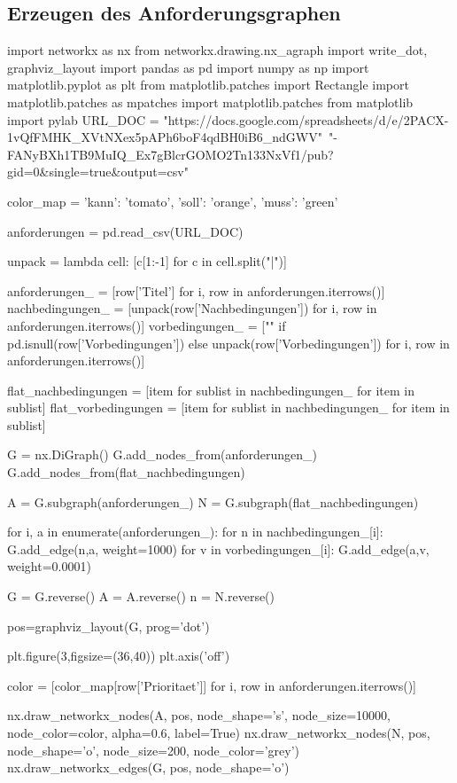 \subsection*{Erzeugen des Anforderungsgraphen}


\begin{python}
import networkx as nx
from networkx.drawing.nx_agraph import write_dot, graphviz_layout
import pandas as pd
import numpy as np
import matplotlib.pyplot as plt
from matplotlib.patches import Rectangle
import matplotlib.patches as mpatches
import matplotlib.patches
from matplotlib import pylab
URL_DOC =   "https://docs.google.com/spreadsheets/d/e/2PACX-1vQfFMHK_XVtNXex5pAPh6boF4qdBH0iB6_ndGWV"\
            "-FANyBXh1TB9MuIQ_Ex7gBlcrGOMO2Tn133NxVf1/pub?gid=0&single=true&output=csv"

color_map = {
  'kann': 'tomato',
  'soll': 'orange',
  'muss': 'green'
}

anforderungen = pd.read_csv(URL_DOC)

unpack = lambda cell: [c[1:-1] for c in cell.split("|")]

anforderungen_ = [row['Titel'] for i, row in anforderungen.iterrows()]
nachbedingungen_ = [unpack(row['Nachbedingungen']) for i, row in anforderungen.iterrows()]
vorbedingungen_ =  ["" if pd.isnull(row['Vorbedingungen']) else unpack(row['Vorbedingungen']) for i, row in anforderungen.iterrows()]

flat_nachbedingungen = [item for sublist in nachbedingungen_ for item in sublist]
flat_vorbedingungen = [item for sublist in nachbedingungen_ for item in sublist]


G = nx.DiGraph()
G.add_nodes_from(anforderungen_)
G.add_nodes_from(flat_nachbedingungen)

A = G.subgraph(anforderungen_)
N = G.subgraph(flat_nachbedingungen)

for i, a in enumerate(anforderungen_):
    for n in nachbedingungen_[i]:
        G.add_edge(n,a, weight=1000)
    for v in vorbedingungen_[i]:
        G.add_edge(a,v, weight=0.0001)

G = G.reverse()
A = A.reverse()
n = N.reverse()

pos=graphviz_layout(G, prog='dot')

plt.figure(3,figsize=(36,40))
plt.axis('off')

color = [color_map[row['Prioritaet']] for i, row in anforderungen.iterrows()]

nx.draw_networkx_nodes(A, pos, node_shape='s', node_size=10000, node_color=color, alpha=0.6, label=True)
nx.draw_networkx_nodes(N, pos, node_shape='o', node_size=200, node_color='grey')
nx.draw_networkx_edges(G, pos, node_shape='o')


\end{python}
